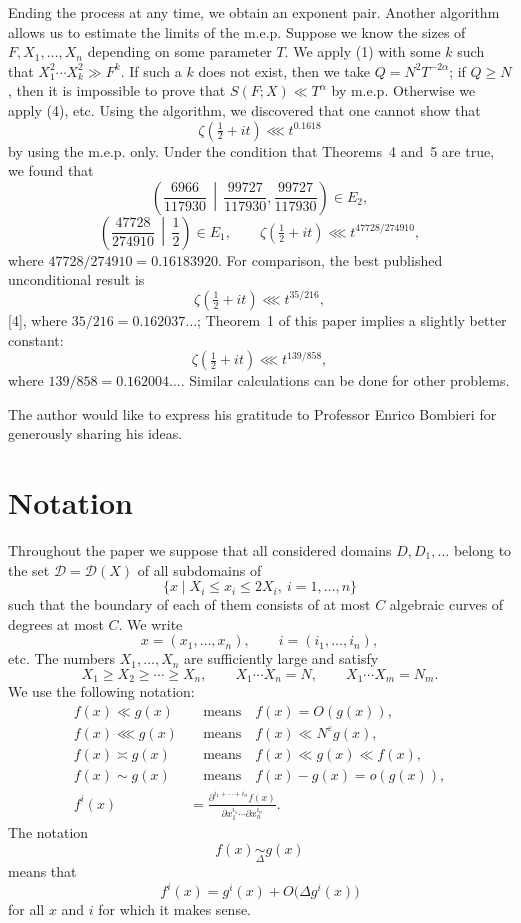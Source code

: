 \documentclass[10pt]{article}
\begin{document}
Ending the process at any time, we obtain an exponent pair. Another algorithm allows us to estimate the limits of the m.e.p. Suppose we know the sizes of $F,X_1,\ldots,X_n$ depending on some parameter $T$. We apply (1) with some $k$ such that $X_1^2\cdots X_k^2\gg F^k$. If such a $k$ does not exist, then we take $Q=N^2T^{-2\alpha}$; if $Q\geqslant N$, then it is impossible to prove that $S(F;X)\ll T^\alpha$ by m.e.p. Otherwise we apply (4), etc. Using the algorithm, we discovered that one cannot show that
\[
  \zeta\left(\tfrac12+it\right)\lll t^{0.1618}
\]
by using the m.e.p. only. Under the condition that Theorems~4 and~5 are true, we found that
\[
  \left(\frac{6966}{117930}\,\middle|\,
        \frac{99727}{117930},\frac{99727}{117930}\right)\in E_2,
\]
\[
  \left(\frac{47728}{274910}\,\middle|\,\frac12\right)\in E_1,
  \qquad
  \zeta\left(\tfrac12+it\right)\lll t^{47728/274910},
\]
where $47728/274910=0.16183920$. For comparison, the best published unconditional result is
\[
  \zeta\left(\tfrac12+it\right)\lll t^{35/216},
\]
[4], where $35/216=0.162037\ldots$; Theorem~1 of this paper implies a slightly better constant:
\[
  \zeta\left(\tfrac12+it\right)\lll t^{139/858},
\]
where $139/858=0.162004\ldots$. Similar calculations can be done for other problems.

The author would like to express his gratitude to Professor Enrico Bombieri for generously sharing his ideas.


\section{Notation}

Throughout the paper we suppose that all considered domains $D,D_1,\ldots$ belong to the set $\mathscr D=\mathscr D(X)$ of all subdomains of
\[
  \{x\mid X_i\leqslant x_i\leqslant2X_i,\ i=1,\ldots,n\}
\]
such that the boundary of each of them consists of at most $C$ algebraic curves of degrees at most $C$. We write
\[
  x=(x_1,\ldots,x_n),\qquad i=(i_1,\ldots,i_n),
\]
etc. The numbers $X_1,\ldots,X_n$ are sufficiently large and satisfy
\[
  X_1\geqslant X_2\geqslant\cdots\geqslant X_n,
  \qquad X_1\cdots X_n=N,
  \qquad X_1\cdots X_m=N_m.
\]
We use the following notation:
\begin{align*}
  f(x)\ll g(x)
  &\quad\text{means}\quad f(x)=O(g(x)),\\
  f(x)\lll g(x)
  &\quad\text{means}\quad f(x)\ll N^\varepsilon g(x),\\
  f(x)\asymp g(x)
  &\quad\text{means}\quad f(x)\ll g(x)\ll f(x),\\
  f(x)\sim g(x)
  &\quad\text{means}\quad f(x)-g(x)=o(g(x)),\\
  f^i(x)
  &=\frac{\partial^{i_1+\cdots+i_n}f(x)}
          {\partial x_1^{i_1}\cdots\partial x_n^{i_n}}.
\end{align*}
The notation
\[
  f(x)\underset{\Delta}{\sim}g(x)
\]
means that
\[
  f^i(x)=g^i(x)+O\bigl(\Delta g^i(x)\bigr)
\]
for all $x$ and $i$ for which it makes sense.
\end{document}
